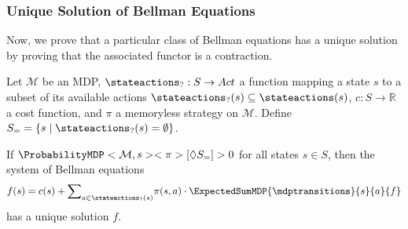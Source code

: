 \documentclass{article}
\newcommand{\Reals}{\mathbb{R}}
\newcommand{\MDP}{\mathcal{M}}
\newcommand{\States}{S}
\newcommand{\Actions}{Act}
\newcommand{\strategy}{\pi}
\newcommand{\reach}{\Diamond}
\begin{document}
\subsubsection*{Unique Solution of Bellman Equations}
Now, we prove that a particular class of Bellman equations has a unique solution by proving that the associated functor is a contraction.
\begin{lemma} \label{stm:bellman_unique_solution}
	Let $\MDP$ be an MDP, $\stateactions_? : \States \to \Actions$ a function mapping a state $s$ to a subset of its available actions $\stateactions_?(s) \subseteq \stateactions(s)$, $c : \States \to \Reals$ a cost function, and $\strategy$ a memoryless strategy on $\MDP$.
	Define $\States_= = \{s \mid \stateactions_?(s) = \emptyset\}$.

	If $\ProbabilityMDP<\MDP, s><\strategy>[\reach \States_=] > 0$ for all states $s \in \States$, then the system of Bellman equations
	\begin{equation*}
		f(s) = c(s) + {\sum}_{a \in \stateactions_?(s)} \strategy(s, a) \cdot \ExpectedSumMDP{\mdptransitions}{s}{a}{f}
	\end{equation*}
	has a unique solution $f$.
\end{lemma}
\end{document}
